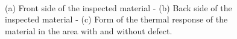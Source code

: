 \begin{figure}
  \centering
	
  \hspace*{\fill}
   \hfill
  \hspace*{\fill} \\ \hspace*{\fill}
  \hspace*{\fill}
	
	  \caption{(a) Front side of the inspected material - (b) Back side of the inspected
		material - (c) Form of the thermal response of the material in the area with and without
		defect.}
		\label{fig:44}
		\end{figure}
